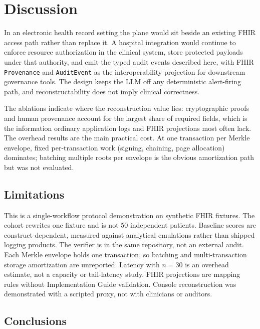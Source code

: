 \documentclass[preprint,review,12pt]{elsarticle}
\begin{document}
\section{Discussion}
\label{sec:discussion}

In an electronic health record setting the plane would sit beside an existing
FHIR access path rather than replace it. A hospital integration would continue
to enforce resource authorization in the clinical system, store protected
payloads under that authority, and emit the typed audit events described
here, with FHIR \texttt{Provenance} and \texttt{AuditEvent} as the
interoperability projection for downstream governance tools. The design keeps
the LLM off any deterministic alert-firing path, and reconstructability does
not imply clinical correctness.

The ablations indicate where the reconstruction value lies: cryptographic
proofs and human provenance account for the largest share of required fields,
which is the information ordinary application logs and FHIR projections most
often lack. The overhead results are the main practical cost. At one
transaction per Merkle envelope, fixed per-transaction work (signing,
chaining, page allocation) dominates; batching multiple roots per envelope is
the obvious amortization path but was not evaluated.

\subsection{Limitations}
\label{sec:limitations}

This is a single-workflow protocol demonstration on synthetic FHIR fixtures.
The cohort rewrites one fixture and is not 50 independent patients. Baseline
scores are construct-dependent, measured against analytical emulations rather
than shipped logging products. The verifier is in the same repository, not an
external audit. Each Merkle envelope holds one transaction, so batching and
multi-transaction storage amortization are unreported. Latency with $n=30$ is
an overhead estimate, not a capacity or tail-latency study. FHIR projections
are mapping rules without Implementation Guide validation. Console
reconstruction was demonstrated with a scripted proxy, not with clinicians or
auditors.

\subsection{Conclusions}
\label{sec:conclusion}
\end{document}
